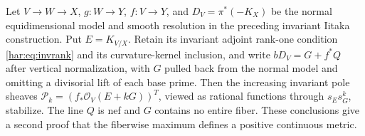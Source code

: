\begin{proposition}\label{har:prop:pole-stabilization}
Let $V\to W\to X$, $g:W\to Y$, $f:V\to Y$, and $D_V=\pi^*(-K_X)$ be the normal equidimensional model and smooth resolution in the preceding invariant Iitaka construction. Put $E=K_{V/X}$. Retain its invariant adjoint rank-one condition \eqref{har:eq:invrank} and its curvature-kernel inclusion, and write $bD_V=G+f^*Q$ after vertical normalization, with $G$ pulled back from the normal model and omitting a divisorial lift of each base prime. Then the increasing invariant pole sheaves
$\mathcal P_k=(f_*\mathcal O_V(E+kG))^T$, viewed as rational functions through $s_Es_G^k$, stabilize. The line $Q$ is nef and $G$ contains no entire fiber. These conclusions give a second proof that the fiberwise maximum defines a positive continuous metric.
\end{proposition}

